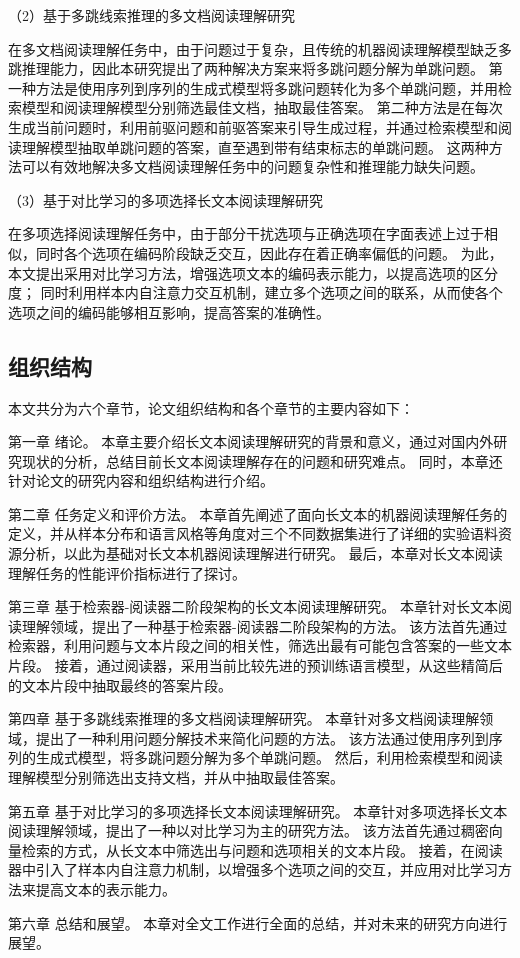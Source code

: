 （2）基于多跳线索推理的多文档阅读理解研究

在多文档阅读理解任务中，由于问题过于复杂，且传统的机器阅读理解模型缺乏多跳推理能力，因此本研究提出了两种解决方案来将多跳问题分解为单跳问题。
第一种方法是使用序列到序列的生成式模型\cite{Lewis2019BARTDS,Ni2021SentenceT5SS}将多跳问题转化为多个单跳问题，并用检索模型和阅读理解模型分别筛选最佳文档，抽取最佳答案。
第二种方法是在每次生成当前问题时，利用前驱问题和前驱答案来引导生成过程，并通过检索模型和阅读理解模型抽取单跳问题的答案，直至遇到带有结束标志的单跳问题。
这两种方法可以有效地解决多文档阅读理解任务中的问题复杂性和推理能力缺失问题。

（3）基于对比学习的多项选择长文本阅读理解研究

在多项选择阅读理解任务中，由于部分干扰选项与正确选项在字面表述上过于相似，同时各个选项在编码阶段缺乏交互，因此存在着正确率偏低的问题。
为此，本文提出采用对比学习方法\cite{gao2021simcse}，增强选项文本的编码表示能力，以提高选项的区分度；
同时利用样本内自注意力交互机制\cite{vaswani2017attention}，建立多个选项之间的联系，从而使各个选项之间的编码能够相互影响，提高答案的准确性。

\subsection{组织结构}
本文共分为六个章节，论文组织结构和各个章节的主要内容如下：

第一章 绪论。
本章主要介绍长文本阅读理解研究的背景和意义，通过对国内外研究现状的分析，总结目前长文本阅读理解存在的问题和研究难点。
同时，本章还针对论文的研究内容和组织结构进行介绍。

第二章 任务定义和评价方法。
本章首先阐述了面向长文本的机器阅读理解任务的定义，并从样本分布和语言风格等角度对三个不同数据集进行了详细的实验语料资源分析，以此为基础对长文本机器阅读理解进行研究。
最后，本章对长文本阅读理解任务的性能评价指标进行了探讨。

第三章 基于检索器-阅读器二阶段架构的长文本阅读理解研究。
本章针对长文本阅读理解领域，提出了一种基于检索器-阅读器二阶段架构的方法。
该方法首先通过检索器，利用问题与文本片段之间的相关性，筛选出最有可能包含答案的一些文本片段。
接着，通过阅读器，采用当前比较先进的预训练语言模型，从这些精简后的文本片段中抽取最终的答案片段。

第四章 基于多跳线索推理的多文档阅读理解研究。
本章针对多文档阅读理解领域，提出了一种利用问题分解技术来简化问题的方法。
该方法通过使用序列到序列的生成式模型，将多跳问题分解为多个单跳问题。
然后，利用检索模型和阅读理解模型分别筛选出支持文档，并从中抽取最佳答案。

第五章 基于对比学习的多项选择长文本阅读理解研究。
本章针对多项选择长文本阅读理解领域，提出了一种以对比学习为主的研究方法。
该方法首先通过稠密向量检索的方式，从长文本中筛选出与问题和选项相关的文本片段。
接着，在阅读器中引入了样本内自注意力机制，以增强多个选项之间的交互，并应用对比学习方法来提高文本的表示能力。

第六章 总结和展望。
本章对全文工作进行全面的总结，并对未来的研究方向进行展望。


